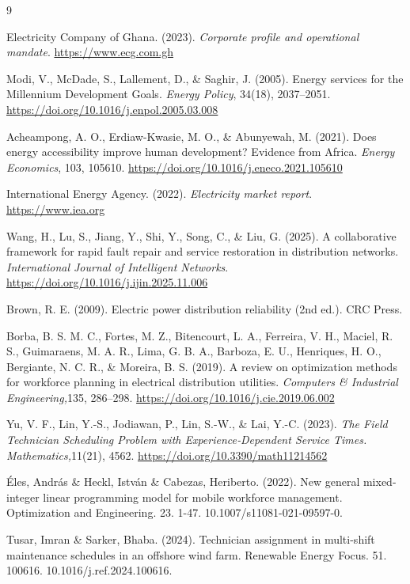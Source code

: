 \documentclass[11pt]{article}
\begin{document}

\begin{thebibliography}{9}

Electricity Company of Ghana. (2023). 
\textit{Corporate profile and operational mandate}. 
\url{https://www.ecg.com.gh}

Modi, V., McDade, S., Lallement, D., \& Saghir, J. (2005). 
Energy services for the Millennium Development Goals. 
\textit{Energy Policy}, 34(18), 2037--2051. 
\url{https://doi.org/10.1016/j.enpol.2005.03.008}

Acheampong, A. O., Erdiaw-Kwasie, M. O., \& Abunyewah, M. (2021). 
Does energy accessibility improve human development? Evidence from Africa. 
\textit{Energy Economics}, 103, 105610. 
\url{https://doi.org/10.1016/j.eneco.2021.105610}

International Energy Agency. (2022). 
\textit{Electricity market report}. 
\url{https://www.iea.org}

Wang, H., Lu, S., Jiang, Y., Shi, Y., Song, C., \& Liu, G. (2025). 
A collaborative framework for rapid fault repair and service restoration in distribution networks. 
\textit{International Journal of Intelligent Networks}. 
\url{https://doi.org/10.1016/j.ijin.2025.11.006}


Brown, R. E. (2009). Electric power distribution reliability (2nd ed.). CRC Press.

Borba, B. S. M. C., Fortes, M. Z., Bitencourt, L. A., Ferreira, V. H., Maciel, R. S., Guimaraens, M. A. R., Lima, G. B. A., Barboza, E. U., Henriques, H. O., Bergiante, N. C. R., \& Moreira, B. S. (2019). A review on optimization methods for workforce planning in electrical distribution utilities.
\textit{ Computers \& Industrial Engineering,}135, 286–298. 
\url{https://doi.org/10.1016/j.cie.2019.06.002}


Yu, V. F., Lin, Y.-S., Jodiawan, P., Lin, S.-W., \& Lai, Y.-C. (2023). 
\textit{The Field Technician Scheduling Problem with Experience‑Dependent Service Times. Mathematics,}11(21), 4562.   
\url{https://doi.org/10.3390/math11214562}

Éles, András \& Heckl, István \& Cabezas, Heriberto. (2022). New general mixed-integer linear programming model for mobile workforce management. Optimization and Engineering. 23. 1-47. 10.1007/s11081-021-09597-0. 


Tusar, Imran \& Sarker, Bhaba. (2024). Technician assignment in multi-shift maintenance schedules in an offshore wind farm. Renewable Energy Focus. 51. 100616. 10.1016/j.ref.2024.100616. 

\end{thebibliography}
\end{document}
